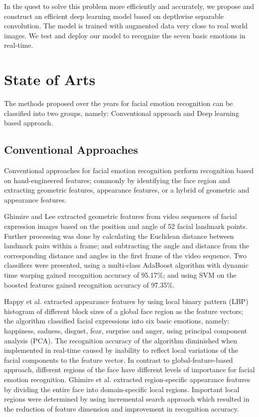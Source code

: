 \documentclass[master]{thesis-uestc}
\begin{document}
In the quest to solve this problem more efficiently and accurately, we propose and construct an efficient deep learning model based on depthwise separable convolution. The model is trained with augmented data very close to real world images. We test and deploy our model to recognize the seven basic emotions in real-time.

\section{State of Arts}
The methods proposed over the years for facial emotion recognition can be classified into two groups, namely: Conventional approach and Deep learning based approach.

\subsection{Conventional Approaches}
Conventional approaches for facial emotion recognition perform recognition based on hand-engineered features; commonly by identifying the face region and extracting geometric features, appearance features, or a hybrid of geometric and appearance features.

Ghimire and Lee extracted geometric features from video sequences of facial expression images based on the position and angle of 52 facial landmark points. Further processing was done by calculating the Euclidean distance between landmark pairs within a frame; and subtracting the angle and distance from the corresponding distance and angles in the first frame of the video sequence. Two classifiers were presented, using a multi-class AdaBoost algorithm with dynamic time warping gained recognition accuracy of 95.17\%; and using SVM on the boosted features gained recognition accuracy of 97.35\%.

Happy et al. extracted appearance features by using local binary pattern (LBP) histogram of different block sizes of a global face region as the feature vectors; the algorithm classified facial expressions into six basic emotions, namely: happiness, sadness, disgust, fear, surprise and anger, using principal component analysis (PCA). The recognition accuracy of the algorithm diminished when implemented in real-time caused by inability to reflect local variations of the facial components to the feature vector. In contrast to global-feature-based approach, different regions of the face have different levels of importance for facial emotion recognition. Ghimire et al. extracted region-specific appearance features by dividing the entire face into domain-specific local regions. Important local regions were determined by using incremental search approach which resulted in the reduction of feature dimension and improvement in recognition accuracy.
\end{document}
